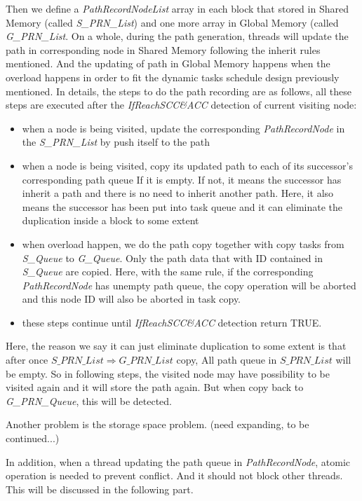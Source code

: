\documentclass{llncs}
\begin{document}
Then we define a \textsl{PathRecordNodeList} array in each block that stored in Shared Memory (called \textsl{S\_PRN\_List}) and one more array in Global Memory (called \textsl{G\_PRN\_List}. On a whole, during the path generation, threads will update the path in corresponding node in Shared Memory following the inherit rules mentioned. And the updating of path in Global Memory happens when the overload happens in order to fit the dynamic tasks schedule design previously mentioned. In details, the steps to do the path recording are as follows, all these steps are executed after the \textsl{IfReachSCC\&ACC} detection of current visiting node:

\begin{itemize}
	\item when a node is being visited, update the corresponding \textsl{PathRecordNode} in the \textsl{S\_PRN\_List} by push itself to the path
	\item when a node is being visited, copy its updated path to each of its successor's corresponding path queue If it is empty. If not, it means the successor has inherit a path and there is no need to inherit another path. Here, it also means the successor has been put into task queue and it can eliminate the duplication inside a block to some extent
	\item when overload happen, we do the path copy together with copy tasks from \textsl{S\_Queue} to \textsl{G\_Queue}. Only the path data that with ID contained in \textsl{S\_Queue} are copied. Here, with the same rule, if the corresponding \textsl{PathRecordNode} has unempty path queue, the copy operation will be aborted and this node ID will also be aborted in task copy.
	\item these steps continue until \textsl{IfReachSCC\&ACC} detection return TRUE.
\end{itemize}

Here, the reason we say it can just eliminate duplication to some extent is that after once \textsl{$S\_PRN\_List \Rightarrow G\_PRN\_List$} copy, All path queue in \textsl{$S\_PRN\_List$} will be empty. So in following steps, the visited node may have possibility to be visited again and it will store the path again. But when copy back to \textsl{G\_PRN\_Queue}, this will be detected.

Another problem is the storage space problem. (need expanding, to be continued...)

In addition, when a thread updating the path queue in \textsl{PathRecordNode}, atomic operation is needed to prevent conflict. And it should not block other threads. This will be discussed in the following part.
%
\end{document}
